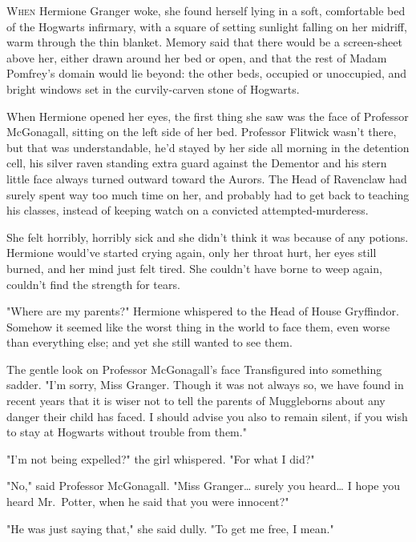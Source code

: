 
\lettrine{W}{hen} Hermione 
Granger woke, she found herself lying in a soft, comfortable bed of the 
Hogwarts infirmary, with a square of setting sunlight falling on her midriff, 
warm through the thin blanket. Memory said that there would be a screen-sheet 
above her, either drawn around her bed or open, and that the rest of Madam 
Pomfrey's domain would lie beyond: the other beds, occupied or unoccupied, and 
bright windows set in the curvily-carven stone of Hogwarts.

When Hermione opened her eyes, the first thing she saw was the face of 
Professor McGonagall, sitting on the left side of her bed. Professor Flitwick 
wasn't there, but that was understandable, he'd stayed by her side all morning 
in the detention cell, his silver raven standing extra guard against the 
Dementor and his stern little face always turned outward toward the Aurors. The 
Head of Ravenclaw had surely spent way too much time on her, and probably had 
to get back to teaching his classes, instead of keeping watch on a convicted 
attempted-murderess.

She felt horribly, horribly sick and she didn't think it was because of any 
potions. Hermione would've started crying again, only her throat hurt, her eyes 
still burned, and her mind just felt tired. She couldn't have borne to weep 
again, couldn't find the strength for tears.

"Where are my parents?" Hermione whispered to the Head of House Gryffindor. 
Somehow it seemed like the worst thing in the world to face them, even worse 
than everything else; and yet she still wanted to see them.

The gentle look on Professor McGonagall's face Transfigured into something 
sadder. "I'm sorry, Miss Granger. Though it was not always so, we have found in 
recent years that it is wiser not to tell the parents of Muggleborns about any 
danger their child has faced. I should advise you also to remain silent, if you 
wish to stay at Hogwarts without trouble from them."

"I'm not being expelled?" the girl whispered. "For what I did?"

"No," said Professor McGonagall. "Miss Granger{\ldots} surely you heard{\ldots} 
I hope you heard Mr.~Potter, when he said that you were innocent?"

"He was just saying that," she said dully. "To get me free, I mean."


